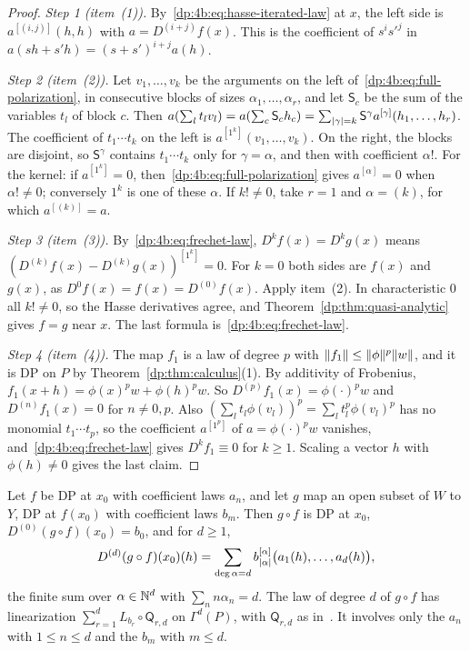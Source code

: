 \begin{proof}
\emph{Step 1 (item~(1)).} By~\eqref{dp:4b:eq:hasse-iterated-law} at $x$, the left side is $a^{[(i,j)]}(h,h)$ with $a=D^{(i+j)}f(x)$. This is the coefficient of $s^is'^j$ in $a(sh+s'h)=(s+s')^{i+j}a(h)$.

\emph{Step 2 (item~(2)).} Let $v_1,\dots,v_k$ be the arguments on the left of~\eqref{dp:4b:eq:full-polarization}, in consecutive blocks of sizes $\alpha_1,\dots,\alpha_r$, and let $\mathsf S_c$ be the sum of the variables $t_l$ of block $c$. Then $a(\sum_lt_lv_l)=a(\sum_c\mathsf S_ch_c)=\sum_{\lvert \gamma\rvert=k}\mathsf S^\gamma a^{[\gamma]}(h_1,\dots,h_r)$. The coefficient of $t_1\cdots t_k$ on the left is $a^{[1^k]}(v_1,\dots,v_k)$. On the right, the blocks are disjoint, so $\mathsf S^\gamma$ contains $t_1\cdots t_k$ only for $\gamma=\alpha$, and then with coefficient $\alpha!$. For the kernel: if $a^{[1^k]}=0$, then~\eqref{dp:4b:eq:full-polarization} gives $a^{[\alpha]}=0$ when $\alpha!\ne0$; conversely $1^k$ is one of these $\alpha$. If $k!\ne0$, take $r=1$ and $\alpha=(k)$, for which $a^{[(k)]}=a$.

\emph{Step 3 (item~(3)).} By~\eqref{dp:4b:eq:frechet-law}, $D^kf(x)=D^kg(x)$ means $(D^{(k)}f(x)-D^{(k)}g(x))^{[1^k]}=0$. For $k=0$ both sides are $f(x)$ and $g(x)$, as $D^0f(x)=f(x)=D^{(0)}f(x)$. Apply item~(2). In characteristic $0$ all $k!\ne0$, so the Hasse derivatives agree, and Theorem~\ref{dp:thm:quasi-analytic} gives $f=g$ near $x$. The last formula is~\eqref{dp:4b:eq:frechet-law}.

\emph{Step 4 (item~(4)).} The map $f_1$ is a law of degree $p$ with $\lVert f_1\rVert\le\lVert \phi\rVert^p\lVert w\rVert$, and it is DP on $P$ by Theorem~\ref{dp:thm:calculus}(1). By additivity of Frobenius, $f_1(x+h)=\phi(x)^pw+\phi(h)^pw$. So $D^{(p)}f_1(x)=\phi(\cdot)^pw$ and $D^{(n)}f_1(x)=0$ for $n\ne0,p$. Also $(\sum_lt_l\phi(v_l))^p=\sum_lt_l^p\phi(v_l)^p$ has no monomial $t_1\cdots t_p$, so the coefficient $a^{[1^p]}$ of $a=\phi(\cdot)^pw$ vanishes, and~\eqref{dp:4b:eq:frechet-law} gives $D^kf_1\equiv0$ for $k\ge1$. Scaling a vector $h$ with $\phi(h)\ne0$ gives the last claim.
\end{proof}

\begin{proposition}\label{dp:prop:chain-rule}
Let $f$ be DP at $x_0$ with coefficient laws $a_n$, and let $g$ map an open subset of $W$ to $Y$, DP at $f(x_0)$ with coefficient laws $b_m$. Then $g\circ f$ is DP at $x_0$, $D^{(0)}(g\circ f)(x_0)=b_0$, and for $d\ge1$,
\begin{equation}\label{dp:4b:eq:chain-rule}
 D^{(d)}(g\circ f)(x_0)(h)=\sum_{\deg\alpha=d}b_{\lvert \alpha\rvert}^{[\alpha]}\bigl(a_1(h),\dots,a_d(h)\bigr),
\end{equation}
the finite sum over $\alpha\in\mathbb N^d$ with $\sum_nn\alpha_n=d$. The law of degree $d$ of $g\circ f$ has linearization $\sum_{r=1}^dL_{b_r}\circ\mathsf Q_{r,d}$ on $\Gamma^d(P)$, with $\mathsf Q_{r,d}$ as in~\cite[Lemma~Q.4]{I}. It involves only the $a_n$ with $1\le n\le d$ and the $b_m$ with $m\le d$.
\end{proposition}

